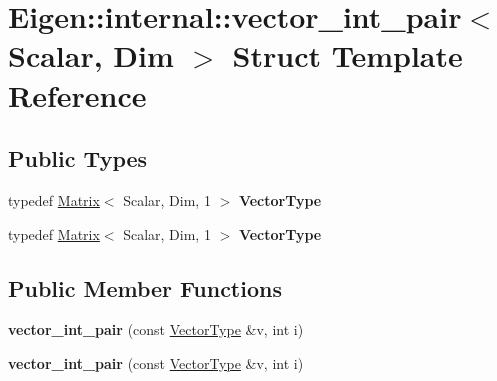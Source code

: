 \hypertarget{struct_eigen_1_1internal_1_1vector__int__pair}{}\section{Eigen\+:\+:internal\+:\+:vector\+\_\+int\+\_\+pair$<$ Scalar, Dim $>$ Struct Template Reference}
\label{struct_eigen_1_1internal_1_1vector__int__pair}
\subsection*{Public Types}
\begin{DoxyCompactItemize}
\item 
\mbox{\label{struct_eigen_1_1internal_1_1vector__int__pair_a5bbca539af0e044e228ffdac148acb0d}} 
typedef \hyperlink{group___core___module_class_eigen_1_1_matrix}{Matrix}$<$ Scalar, Dim, 1 $>$ {\bfseries Vector\+Type}
\item 
\mbox{\label{struct_eigen_1_1internal_1_1vector__int__pair_a5bbca539af0e044e228ffdac148acb0d}} 
typedef \hyperlink{group___core___module_class_eigen_1_1_matrix}{Matrix}$<$ Scalar, Dim, 1 $>$ {\bfseries Vector\+Type}
\end{DoxyCompactItemize}
\subsection*{Public Member Functions}
\begin{DoxyCompactItemize}
\item 
\mbox{\label{struct_eigen_1_1internal_1_1vector__int__pair_a57ff48b50f6ca52a4817e9a1d69882df}} 
{\bfseries vector\+\_\+int\+\_\+pair} (const \hyperlink{group___core___module}{Vector\+Type} \&v, int i)
\item 
\mbox{\label{struct_eigen_1_1internal_1_1vector__int__pair_a57ff48b50f6ca52a4817e9a1d69882df}} 
{\bfseries vector\+\_\+int\+\_\+pair} (const \hyperlink{group___core___module}{Vector\+Type} \&v, int i)
\end{DoxyCompactItemize}
